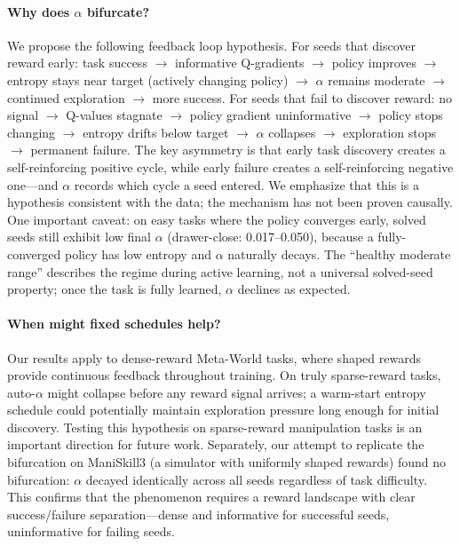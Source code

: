 \documentclass[twocolumn]{article}
\begin{document}
\paragraph{Why does $\alpha$ bifurcate?}
We propose the following feedback loop hypothesis. For seeds that discover
reward early: task success $\to$ informative Q-gradients $\to$ policy improves
$\to$ entropy stays near target (actively changing policy) $\to$ $\alpha$
remains moderate $\to$ continued exploration $\to$ more success. For seeds
that fail to discover reward: no signal $\to$ Q-values stagnate $\to$ policy
gradient uninformative $\to$ policy stops changing $\to$ entropy drifts below
target $\to$ $\alpha$ collapses $\to$ exploration stops $\to$ permanent failure.
The key asymmetry is that early task discovery creates a self-reinforcing
positive cycle, while early failure creates a self-reinforcing negative one---and
$\alpha$ records which cycle a seed entered. We emphasize that this is a
hypothesis consistent with the data; the mechanism has not been proven causally.
One important caveat: on easy tasks where the policy converges early, solved
seeds still exhibit low final $\alpha$ (drawer-close: 0.017--0.050), because
a fully-converged policy has low entropy and $\alpha$ naturally decays. The
``healthy moderate range'' describes the regime during active learning, not
a universal solved-seed property; once the task is fully learned, $\alpha$
declines as expected.

\paragraph{When might fixed schedules help?}
Our results apply to dense-reward Meta-World tasks, where shaped rewards provide
continuous feedback throughout training. On truly sparse-reward tasks, auto-$\alpha$
might collapse before any reward signal arrives; a warm-start entropy schedule
could potentially maintain exploration pressure long enough for initial discovery.
Testing this hypothesis on sparse-reward manipulation tasks is an important
direction for future work. Separately, our attempt to replicate the bifurcation
on ManiSkill3 (a simulator with uniformly shaped rewards) found no bifurcation:
$\alpha$ decayed identically across all seeds regardless of task difficulty. This
confirms that the phenomenon requires a reward landscape with clear
success/failure separation---dense and informative for successful seeds,
uninformative for failing seeds.
\end{document}
